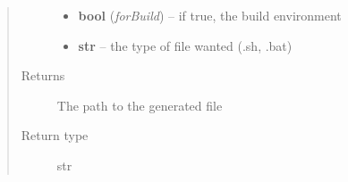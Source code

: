 \documentclass[a4paper,10pt,english]{sphinxmanual}
\begin{document}
\begin{fulllineitems}
\begin{fulllineitems}
\begin{quote}
\begin{description}
\begin{itemize}
\item {} 
\textbf{bool} (\emph{forBuild}) -- if true, the build environment

\item {} 
\textbf{str} -- the type of file wanted (.sh, .bat)

\end{itemize}

\item[{Returns}] \leavevmode
The path to the generated file

\item[{Return type}] \leavevmode
str

\end{description}\end{quote}

\end{fulllineitems}


\end{fulllineitems}

\end{document}
